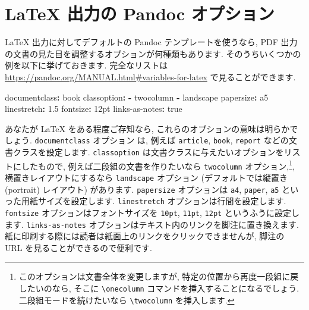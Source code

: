 \documentclass[
  11pt,
  lualatex,
  ja=standard]{bxjsreport}
\newenvironment{Shaded}{\begin{snugshade}}{\end{snugshade}}
\newcommand{\AttributeTok}[1]{\textcolor[rgb]{0.77,0.63,0.00}{#1}}
\newcommand{\CharTok}[1]{\textcolor[rgb]{0.31,0.60,0.02}{#1}}
\newcommand{\FloatTok}[1]{\textcolor[rgb]{0.00,0.00,0.81}{#1}}
\newcommand{\FunctionTok}[1]{\textcolor[rgb]{0.00,0.00,0.00}{#1}}
\newcommand{\KeywordTok}[1]{\textcolor[rgb]{0.13,0.29,0.53}{\textbf{#1}}}
\begin{document}
\hypertarget{latex-variables}{%
\section{LaTeX 出力の Pandoc オプション}\label{latex-variables}}

LaTeX 出力に対してデフォルトの Pandoc テンプレートを使うなら, PDF 出力の文書の見た目を調整するオプションが何種類もあります. そのうちいくつかの例を以下に挙げておきます. 完全なリストは \url{https://pandoc.org/MANUAL.html\#variables-for-latex} で見ることができます.

\begin{Shaded}
\begin{Highlighting}[]
\FunctionTok{documentclass}\KeywordTok{:}\AttributeTok{ book}
\FunctionTok{classoption}\KeywordTok{:}
\AttributeTok{  }\KeywordTok{{-}}\AttributeTok{ twocolumn}
\AttributeTok{  }\KeywordTok{{-}}\AttributeTok{ landscape}
\FunctionTok{papersize}\KeywordTok{:}\AttributeTok{ a5}
\FunctionTok{linestretch}\KeywordTok{:}\AttributeTok{ }\FloatTok{1.5}
\FunctionTok{fontsize}\KeywordTok{:}\AttributeTok{ 12pt}
\FunctionTok{links{-}as{-}notes}\KeywordTok{:}\AttributeTok{ }\CharTok{true}
\end{Highlighting}
\end{Shaded}

あなたが LaTeX をある程度ご存知なら, これらのオプションの意味は明らかでしょう. \texttt{documentclass} オプション は, 例えば \texttt{article}, \texttt{book}, \texttt{report} などの文書クラスを設定します. \texttt{classoption} は文書クラスに与えたいオプションをリストにしたもので, 例えば二段組の文書を作りたいなら \texttt{twocolumn} オプション,\footnote{このオプションは文書全体を変更しますが, 特定の位置から再度一段組に戻したいのなら, そこに \texttt{\textbackslash{}onecolumn} コマンドを挿入することになるでしょう. 二段組モードを続けたいなら \texttt{\textbackslash{}twocolumn} を挿入します.}, 横置きレイアウトにするなら \texttt{landscape} オプション (デフォルトでは縦置き (portrait) レイアウト) があります. \texttt{papersize} オプションは \texttt{a4}, \texttt{paper}, \texttt{a5} といった用紙サイズを設定します. \texttt{linestretch} オプションは行間を設定します. \texttt{fontsize} オプションはフォントサイズを \texttt{10pt}, \texttt{11pt}, \texttt{12pt} というふうに設定します. \texttt{links-as-notes} オプションはテキスト内のリンクを脚注に置き換えます. 紙に印刷する際には読者は紙面上のリンクをクリックできませんが, 脚注の URL を見ることができるので便利です.
\end{document}
